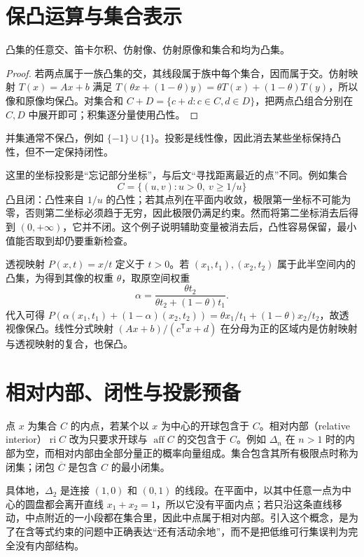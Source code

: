 \documentclass[UTF8,12pt,a4paper,fontset=fandol]{ctexbook}
\begin{document}
\section{保凸运算与集合表示}

\begin{proposition}
凸集的任意交、笛卡尔积、仿射像、仿射原像和集合和均为凸集。
\end{proposition}
\begin{proof}
若两点属于一族凸集的交，其线段属于族中每个集合，因而属于交。仿射映射 $T(x)=Ax+b$ 满足 $T(\theta x+(1-\theta)y)=\theta T(x)+(1-\theta)T(y)$，所以像和原像均保凸。对集合和 $C+D=\{c+d:c\in C,d\in D\}$，把两点凸组合分别在 $C,D$ 中展开即可；积集逐分量使用凸性。
\end{proof}

并集通常不保凸，例如 $\{-1\}\cup\{1\}$。投影是线性像，因此消去某些坐标保持凸性，但不一定保持闭性。

这里的坐标投影是“忘记部分坐标”，与后文“寻找距离最近的点”不同。例如集合
\[
 C=\{(u,v):u>0,\ v\geq1/u\}
\]
凸且闭：凸性来自 $1/u$ 的凸性；若其点列在平面内收敛，极限第一坐标不可能为零，否则第二坐标必须趋于无穷，因此极限仍满足约束。然而将第二坐标消去后得到 $(0,+\infty)$，它并不闭。这个例子说明辅助变量被消去后，凸性容易保留，最小值能否取到却仍要重新检查。

透视映射 $P(x,t)=x/t$ 定义于 $t>0$。若 $(x_1,t_1),(x_2,t_2)$ 属于此半空间内的凸集，为得到其像的权重 $\theta$，取原空间权重
\[
 \alpha=\frac{\theta t_2}{\theta t_2+(1-\theta)t_1}.
\]
代入可得 $P(\alpha(x_1,t_1)+(1-\alpha)(x_2,t_2))=\theta x_1/t_1+(1-\theta)x_2/t_2$，故透视像保凸。线性分式映射 $(Ax+b)/(c^{\mathsf T}x+d)$ 在分母为正的区域内是仿射映射与透视映射的复合，也保凸。

\section{相对内部、闭性与投影预备}

点 $x$ 为集合 $C$ 的内点，若某个以 $x$ 为中心的开球包含于 $C$。相对内部（relative interior）$\operatorname{ri}C$ 改为只要求开球与 $\operatorname{aff}C$ 的交包含于 $C$。例如 $\Delta_n$ 在 $n>1$ 时的内部为空，而相对内部由全部分量正的概率向量组成。集合包含其所有极限点时称为闭集；闭包 $\overline C$ 是包含 $C$ 的最小闭集。

具体地，$\Delta_2$ 是连接 $(1,0)$ 和 $(0,1)$ 的线段。在平面中，以其中任意一点为中心的圆盘都会离开直线 $x_1+x_2=1$，所以它没有平面内点；若只沿这条直线移动，中点附近的一小段都在集合里，因此中点属于相对内部。引入这个概念，是为了在含等式约束的问题中正确表达“还有活动余地”，而不是把低维可行集误判为完全没有内部结构。
\end{document}
